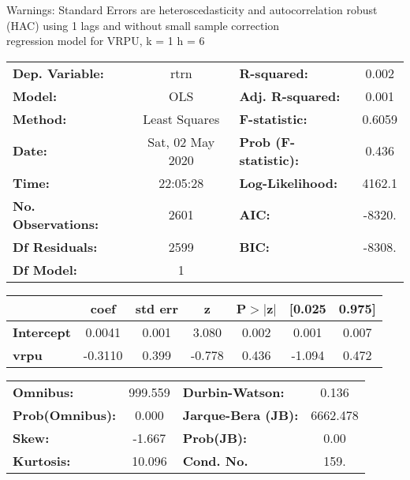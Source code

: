 Warnings: \newline
 [1] Standard Errors are heteroscedasticity and autocorrelation robust (HAC) using 1 lags and without small sample correction\\ 

regression model for VRPU, k = 1 h = 6\begin{center}
\begin{tabular}{lclc}
\toprule
\textbf{Dep. Variable:}    &       rtrn       & \textbf{  R-squared:         } &     0.002   \\
\textbf{Model:}            &       OLS        & \textbf{  Adj. R-squared:    } &     0.001   \\
\textbf{Method:}           &  Least Squares   & \textbf{  F-statistic:       } &    0.6059   \\
\textbf{Date:}             & Sat, 02 May 2020 & \textbf{  Prob (F-statistic):} &    0.436    \\
\textbf{Time:}             &     22:05:28     & \textbf{  Log-Likelihood:    } &    4162.1   \\
\textbf{No. Observations:} &        2601      & \textbf{  AIC:               } &    -8320.   \\
\textbf{Df Residuals:}     &        2599      & \textbf{  BIC:               } &    -8308.   \\
\textbf{Df Model:}         &           1      & \textbf{                     } &             \\
\bottomrule
\end{tabular}
\begin{tabular}{lcccccc}
                   & \textbf{coef} & \textbf{std err} & \textbf{z} & \textbf{P$> |$z$|$} & \textbf{[0.025} & \textbf{0.975]}  \\
\midrule
\textbf{Intercept} &       0.0041  &        0.001     &     3.080  &         0.002        &        0.001    &        0.007     \\
\textbf{vrpu}      &      -0.3110  &        0.399     &    -0.778  &         0.436        &       -1.094    &        0.472     \\
\bottomrule
\end{tabular}
\begin{tabular}{lclc}
\textbf{Omnibus:}       & 999.559 & \textbf{  Durbin-Watson:     } &    0.136  \\
\textbf{Prob(Omnibus):} &   0.000 & \textbf{  Jarque-Bera (JB):  } & 6662.478  \\
\textbf{Skew:}          &  -1.667 & \textbf{  Prob(JB):          } &     0.00  \\
\textbf{Kurtosis:}      &  10.096 & \textbf{  Cond. No.          } &     159.  \\
\bottomrule
\end{tabular}
\end{center}

